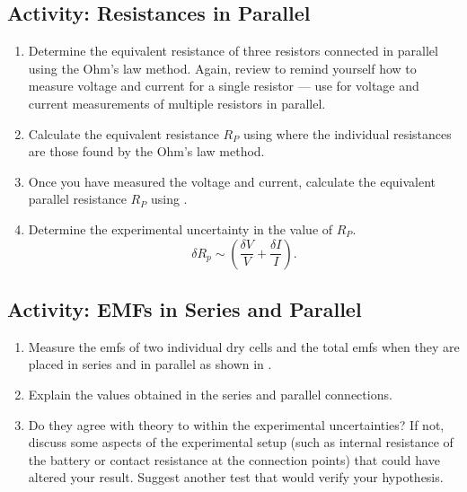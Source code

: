 \subsection{Activity: Resistances in Parallel}
\begin{enumerate}
	\item Determine the equivalent resistance of three resistors connected in parallel using the Ohm's law method.  Again, review  to remind yourself how to measure voltage and current for a single resistor --- use  for voltage and current measurements of multiple resistors in parallel.
	
	\item Calculate the equivalent resistance $R_P$ using  where the individual resistances are those found by the Ohm's law method.

	\item Once you have measured the voltage and current, calculate the equivalent parallel resistance $R_P$ using .
	
	\item Determine the experimental uncertainty in the value of $R_P$. 
	\[ \delta R_{p} \sim \left( \frac{\delta V}{V} + \frac{\delta I}{I} \right). \]
\end{enumerate}


\subsection{Activity: EMFs in Series and Parallel}
\begin{enumerate}
	\item Measure the emfs of two individual dry cells and the total emfs when they are placed in series and in parallel as shown in .
	
	\item Explain the values obtained in the series and parallel connections.
	
	\item Do they agree with theory to within the experimental uncertainties?  If not, discuss some aspects of the experimental setup (such as internal resistance of the battery or contact resistance at the connection points) that could have altered your result.  Suggest another test that would verify your hypothesis.
\end{enumerate}

